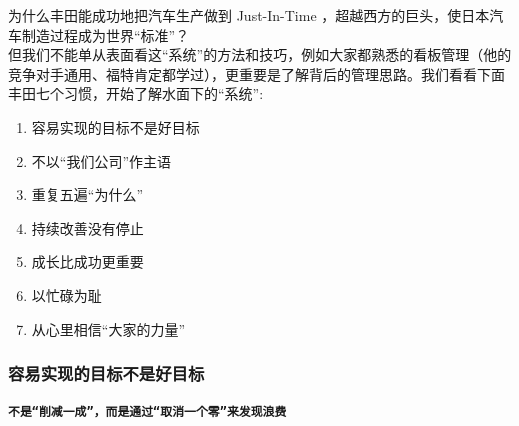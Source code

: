 为什么丰田能成功地把汽车生产做到 Just-In-Time
，超越西方的巨头，使日本汽车制造过程成为世界``标准''？\\
但我们不能单从表面看这``系统''的方法和技巧，例如大家都熟悉的看板管理（他的竞争对手通用、福特肯定都学过），更重要是了解背后的管理思路。我们看看下面丰田七个习惯，开始了解水面下的``系统'':\\


\begin{enumerate}
\tightlist
\item
  容易实现的目标不是好目标
\item
  不以``我们公司''作主语
\item
  重复五遍“为什么”
\item
  持续改善没有停止
\item
  成长比成功更重要
\item
  以忙碌为耻
\item
  从心里相信``大家的力量''
\end{enumerate}

\hypertarget{ux5bb9ux6613ux5b9eux73b0ux7684ux76eeux6807ux4e0dux662fux597dux76eeux6807}{%
\subsubsection{容易实现的目标不是好目标}\label{ux5bb9ux6613ux5b9eux73b0ux7684ux76eeux6807ux4e0dux662fux597dux76eeux6807}}

\textbf{\texttt{不是“削减一成”，而是通过“取消一个零”来发现浪费}}

